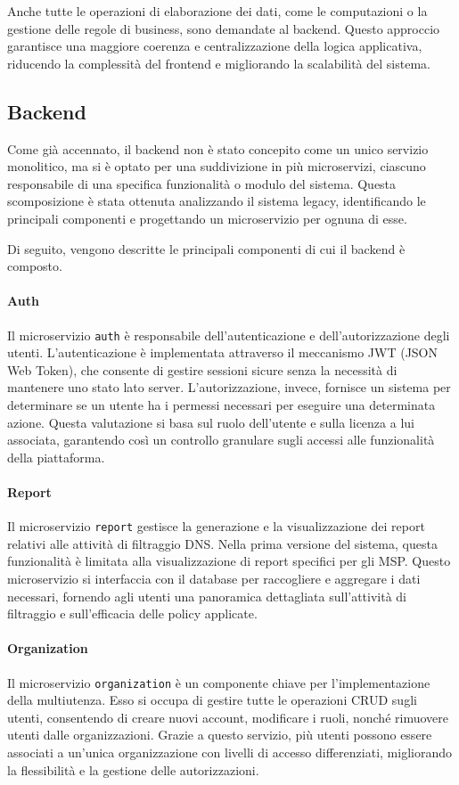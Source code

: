 Anche tutte le operazioni di elaborazione dei dati, come le computazioni o la gestione delle regole di business, sono demandate al backend. Questo approccio garantisce una maggiore coerenza e centralizzazione della logica applicativa, riducendo la complessità del frontend e migliorando la scalabilità del sistema.

\subsection{Backend}
Come già accennato, il backend non è stato concepito come un unico servizio monolitico, ma si è optato per una suddivizione in più microservizi, ciascuno responsabile di una specifica funzionalità o modulo del sistema. Questa scomposizione è stata ottenuta analizzando il sistema legacy, identificando le principali componenti e progettando un microservizio per ognuna di esse.

Di seguito, vengono descritte le principali componenti di cui il backend è composto.

\paragraph{Auth}
Il microservizio \texttt{auth} è responsabile dell'autenticazione e dell'autorizzazione degli utenti. L'autenticazione è implementata attraverso il meccanismo JWT (JSON Web Token), che consente di gestire sessioni sicure senza la necessità di mantenere uno stato lato server.
L'autorizzazione, invece, fornisce un sistema per determinare se un utente ha i permessi necessari per eseguire una determinata azione. Questa valutazione si basa sul ruolo dell'utente e sulla licenza a lui associata, garantendo così un controllo granulare sugli accessi alle funzionalità della piattaforma.

\paragraph{Report}
Il microservizio \texttt{report} gestisce la generazione e la visualizzazione dei report relativi alle attività di filtraggio DNS. Nella prima versione del sistema, questa funzionalità è limitata alla visualizzazione di report specifici per gli MSP. Questo microservizio si interfaccia con il database per raccogliere e aggregare i dati necessari, fornendo agli utenti una panoramica dettagliata sull'attività di filtraggio e sull'efficacia delle policy applicate.

\paragraph{Organization}
Il microservizio \texttt{organization} è un componente chiave per l'implementazione della multiutenza. Esso si occupa di gestire tutte le operazioni CRUD sugli utenti, consentendo di creare nuovi account, modificare i ruoli, nonché rimuovere utenti dalle organizzazioni.
Grazie a questo servizio, più utenti possono essere associati a un'unica organizzazione con livelli di accesso differenziati, migliorando la flessibilità e la gestione delle autorizzazioni.

